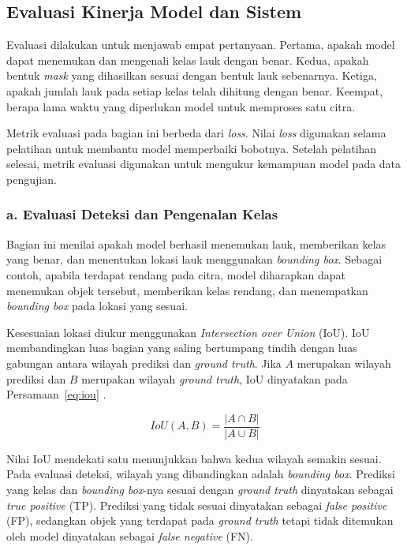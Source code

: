 \subsection{Evaluasi Kinerja Model dan Sistem}

Evaluasi dilakukan untuk menjawab empat pertanyaan. Pertama, apakah model dapat menemukan dan mengenali kelas lauk dengan benar. Kedua, apakah bentuk \textit{mask} yang dihasilkan sesuai dengan bentuk lauk sebenarnya. Ketiga, apakah jumlah lauk pada setiap kelas telah dihitung dengan benar. Keempat, berapa lama waktu yang diperlukan model untuk memproses satu citra.

Metrik evaluasi pada bagian ini berbeda dari \textit{loss}. Nilai \textit{loss} digunakan selama pelatihan untuk membantu model memperbaiki bobotnya. Setelah pelatihan selesai, metrik evaluasi digunakan untuk mengukur kemampuan model pada data pengujian.

\subsubsection*{a. Evaluasi Deteksi dan Pengenalan Kelas}

Bagian ini menilai apakah model berhasil menemukan lauk, memberikan kelas yang benar, dan menentukan lokasi lauk menggunakan \textit{bounding box}. Sebagai contoh, apabila terdapat rendang pada citra, model diharapkan dapat menemukan objek tersebut, memberikan kelas rendang, dan menempatkan \textit{bounding box} pada lokasi yang sesuai.

Kesesuaian lokasi diukur menggunakan \textit{Intersection over Union} (IoU). IoU membandingkan luas bagian yang saling bertumpang tindih dengan luas gabungan antara wilayah prediksi dan \textit{ground truth}. Jika $A$ merupakan wilayah prediksi dan $B$ merupakan wilayah \textit{ground truth}, IoU dinyatakan pada Persamaan~\ref{eq:iou} \cite{qiu2025}.

\begin{equation}
    IoU(A,B) = \frac{|A \cap B|}{|A \cup B|}
    \label{eq:iou}
\end{equation}

Nilai IoU mendekati satu menunjukkan bahwa kedua wilayah semakin sesuai. Pada evaluasi deteksi, wilayah yang dibandingkan adalah \textit{bounding box}. Prediksi yang kelas dan \textit{bounding box}-nya sesuai dengan \textit{ground truth} dinyatakan sebagai \textit{true positive} (TP). Prediksi yang tidak sesuai dinyatakan sebagai \textit{false positive} (FP), sedangkan objek yang terdapat pada \textit{ground truth} tetapi tidak ditemukan oleh model dinyatakan sebagai \textit{false negative} (FN).

